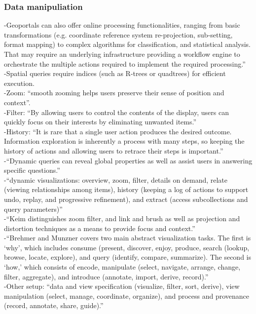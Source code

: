 \subsubsection{Data manipuliation}
-{\color{orange}Geoportals can also offer online processing functionalities, ranging from basic transformations (e.g. coordinate reference system re-projection, sub-setting, format mapping) to complex algorithms for classification, and statistical analysis. That may require an underlying infrastructure providing a workflow engine to orchestrate the multiple actions required to implement the required processing.”\cite{Jiang2020}}\\
-{\color{orange}Spatial queries require indices (such as R-trees or quadtrees) for efficient execution.\cite{Lieberman2010}}\\
-{\color{orange}Zoom: “smooth zooming helps users preserve their sense of position and context”.\cite{Shneiderman1996}}\\
-{\color{orange}Filter: “By allowing users to control the contents of the display, users can quickly focus on their interests by eliminating unwanted items.''\cite{Shneiderman1996}}\\
-{\color{orange}History: “It is rare that a single user action produces the desired outcome. Information exploration is inherently a process with many steps, so keeping the history of actions and allowing users to retrace their steps is important.”\cite{Shneiderman1996}}\\
-{\color{orange}“Dynamic queries can reveal global properties as well as assist users in answering specific questions.”\cite{Shneiderman1996}}\\
-{\color{orange}“dynamic visualizations: overview, zoom, filter, details on demand, relate (viewing relationships among items), history (keeping a log of actions to support undo, replay, and progressive refinement), and extract (access subcollections and query parameters)”\cite{Borner2019}}\\
-{\color{orange}“Keim distinguishes zoom filter, and link and brush as well as projection and distortion techniques as a means to provide focus and context.”\cite{Borner2019}}\\
-{\color{orange}“Brehmer and Munzner covers two main abstract visualization tasks. The first is ‘why’, which includes consume (present, discover, enjoy, produce, search (lookup, browse, locate, explore), and query (identify, compare, summarize). The second is ‘how,’ which consists of encode, manipulate (select, navigate, arrange, change, filter, aggregate), and introduce (annotate, import, derive, record).”\cite{Borner2019}}\\
-{\color{orange}Other setup: “data and view specification (visualize, filter, sort, derive), view manipulation (select, manage, coordinate, organize), and process and provenance (record, annotate, share, guide).”\cite{Borner2019}}\\

